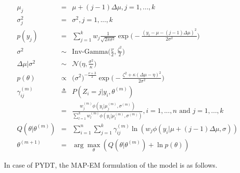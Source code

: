 \documentclass{article}
\begin{document}
	\begin{eqnarray}
		\mu_j &=& \mu + (j-1)\Delta\mu, j = 1,...,k \\
		\sigma^2_j &=& \sigma^2, j = 1,...,k \\
		p(y_j) &=& \sum^k_{j=1} w_j \frac{1}{\sqrt{2\pi \sigma^2}} \exp\Bigg(- \frac{(y_i - \mu - (j - 1)\Delta\mu)^2}{2\sigma^2} \Bigg) \\
		\sigma^2 &\sim & \textrm{Inv-Gamma} \bigg( \frac{\nu}{2}, \frac{\zeta^2}{2} \bigg) \\
		\Delta\mu|\sigma^2 &\sim & \mathcal{N}\bigg( \eta, \frac{\sigma^2}{\kappa} \bigg) \\
		p(\theta) &\propto & \big (\sigma^2 \big)^{-\frac{\nu+3}{2}} \exp \bigg( -\frac{\zeta^2 + \kappa(\Delta\mu - \eta)^2}{2\sigma^2} \bigg) \\
		\gamma^{(m)}_{ij} &\triangleq & P(Z_i = j | y_i, \theta^{(m)}) \nonumber \\
		&=& \frac{w^{(m)}_j \phi(y_i|\mu^{(m)}_j, \sigma^{(m)})}{\sum^k_{l=1}w^{(m)}_l \phi(y_i|\mu^{(m)}_l, \sigma^{(m)})}, i=1,...,n \textrm{ and } j=1,...,k \\
		Q(\theta | \theta^{(m)}) &=& \sum^n_{i=1} \sum^k_{j=1} \gamma^{(m)}_{ij} \ln(w_j \phi(y_i | \mu + (j-1)\Delta\mu, \sigma)) \\
		\theta^{(m+1)} &=& \arg\max_{\theta} (Q(\theta | \theta^{(m)}) + \ln p(\theta))
	\end{eqnarray}

	In case of PYDT, the MAP-EM formulation of the model is as follows.
	
\end{document}
